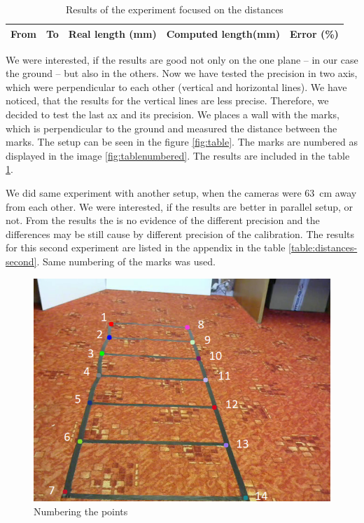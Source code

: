 \begin{table}
\centering
\begin{tabular}{|r|r|r|r|r|}
\hline
From	& To	& Real length (mm) & Computed length(mm) & Error (\%) \\
\hline
\hline

\hline
\end{tabular}
\label{table:distances}
\caption{Results of the experiment focused on the distances}
\end{table}

We were interested, if the results are good not only on the one plane -- in our
case the ground -- but also in the others. Now we have tested the precision in
two axis, which were perpendicular to each other (vertical and horizontal
lines). We have noticed, that the results for the vertical lines are less
precise. Therefore, we decided to test the last ax and its precision. We places
a wall with the marks, which is perpendicular to the ground and measured the
distance between the marks. The setup can be seen in the figure
\ref{fig:table}. The marks are numbered as displayed in the image
\ref{fig:tablenumbered}. The results are included in the table
\ref{table:distances}. 

We did same experiment with another setup, when the cameras were 63~cm away
from each other. We were interested, if the results are better in parallel
setup, or not. From the results the is no evidence of the different precision
and the differences may be still cause by different precision of the
calibration. The results for this second experiment are listed in the appendix
in the table \ref{table:distances-second}. Same numbering of the marks was used.

\begin{figure}
\centering
\includegraphics[width=0.8\linewidth]{img/experiments/right-ladder-numbered.png}
\caption{Numbering the points}
\label{fig:ladder_numbered}
\end{figure}

